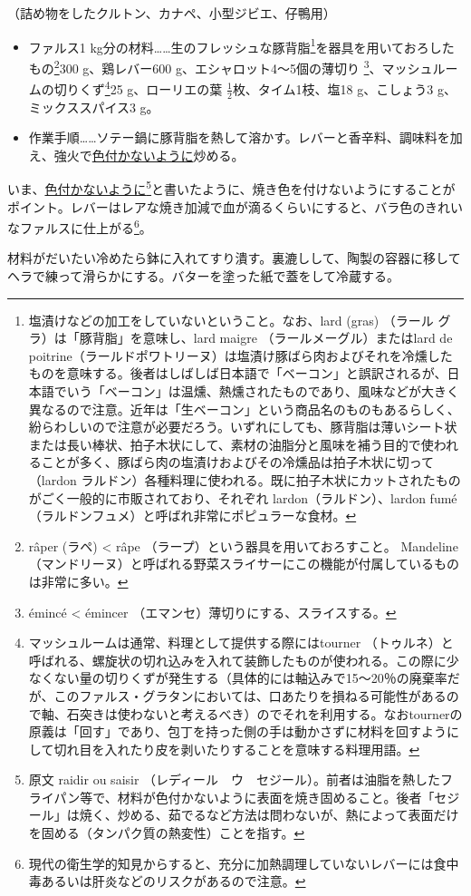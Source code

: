 \begin{recette}
（詰め物をしたクルトン、カナペ、小型ジビエ、仔鴨用）

\begin{itemize}
\item
  ファルス1 kg分の材料\ldots{}\ldots{}生のフレッシュな豚背脂\footnote{塩漬けなどの加工をしていないということ。なお、lard
    (gras) （ラール グラ）は「豚背脂」を意味し、lard maigre
    （ラールメーグル）またはlard de
    poitrine（ラールドポワトリーヌ）は塩漬け豚ばら肉およびそれを冷燻したものを意味する。後者はしばしば日本語で「ベーコン」と誤訳されるが、日本語でいう「ベーコン」は温燻、熱燻されたものであり、風味などが大きく異なるので注意。近年は「生ベーコン」という商品名のものもあるらしく、紛らわしいので注意が必要だろう。いずれにしても、豚背脂は薄いシート状または長い棒状、拍子木状にして、素材の油脂分と風味を補う目的で使われることが多く、豚ばら肉の塩漬けおよびその冷燻品は拍子木状に切って（lardon
    ラルドン）各種料理に使われる。既に拍子木状にカットされたものがごく一般的に市販されており、それぞれ
    lardon（ラルドン）、lardon
    fumé（ラルドンフュメ）と呼ばれ非常にポピュラーな食材。}を器具を用いておろしたもの\footnote{râper
    (ラペ) \textless{} râpe （ラープ）という器具を用いておろすこと。
    Mandeline
    （マンドリーヌ）と呼ばれる野菜スライサーにこの機能が付属しているものは非常に多い。}300
  g、鶏レバー600 g、エシャロット4〜5個の薄切り \footnote{émincé
    \textless{} émincer （エマンセ）薄切りにする、スライスする。}、マッシュルームの切りくず\footnote{マッシュルームは通常、料理として提供する際にはtourner
    （トゥルネ）と呼ばれる、螺旋状の切れ込みを入れて装飾したものが使われる。この際に少なくない量の切りくずが発生する（具体的には軸込みで15〜20％の廃棄率だが、このファルス・グラタンにおいては、口あたりを損ねる可能性があるので軸、石突きは使わないと考えるべき）のでそれを利用する。なおtournerの原義は「回す」であり、包丁を持った側の手は動かさずに材料を回すようにして切れ目を入れたり皮を剥いたりすることを意味する料理用語。}25
  g、ローリエの葉 \(\frac{1}{2}\)枚、タイム1枝、塩18 g、こしょう3
  g、ミックススパイス3 g。
\item
  作業手順\ldots{}\ldots{}ソテー鍋に豚背脂を熱して溶かす。レバーと香辛料、調味料を加え、強火で\ul{色付かないように}炒める。
\end{itemize}

いま、\ul{色付かないように}\footnote{原文 raidir ou saisir
  （レディール　ウ　セジール）。前者は油脂を熱したフライパン等で、材料が色付かないように表面を焼き固めること。後者「セジール」は焼く、炒める、茹でるなど方法は問わないが、熱によって表面だけを固める（タンパク質の熱変性）ことを指す。}と書いたように、焼き色を付けないようにすることがポイント。レバーはレアな焼き加減で血が滴るくらいにすると、バラ色のきれいなファルスに仕上がる\footnote{現代の衛生学的知見からすると、充分に加熱調理していないレバーには食中毒あるいは肝炎などのリスクがあるので注意。}。

材料がだいたい冷めたら鉢に入れてすり潰す。裏漉しして、陶製の容器に移してヘラで練って滑らかにする。バターを塗った紙で蓋をして冷蔵する。

\end{recette}

